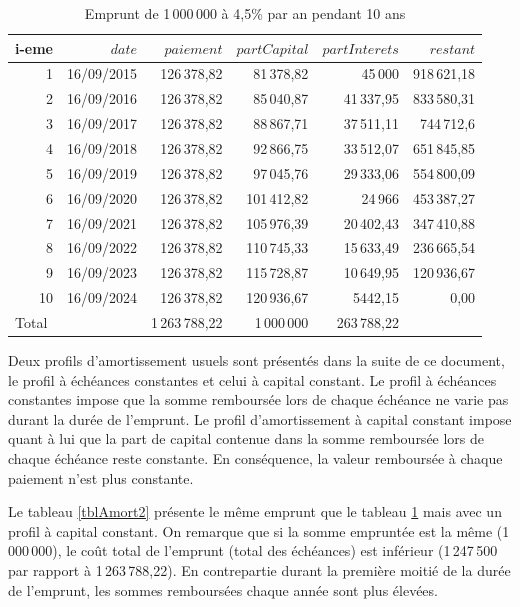 \documentclass[11pt,a4paper]{scrartcl}
\begin{document}
\begin{table}
\centering
\caption{Emprunt de 1\,000\,000 à 4,5\% par an pendant 10 ans}
\begin{tabular}{rrrrrr}
i-eme & $date$ & $paiement$ & $partCapital$ & $partInterets$ & $restant$ \\ 
\hline
1 & 16/09/2015 & 126\,378,82 & 81\,378,82 & 45\,000 & 918\,621,18 \\ 
2 & 16/09/2016 & 126\,378,82 & 85\,040,87 & 41\,337,95 & 833\,580,31 \\ 
3 & 16/09/2017 & 126\,378,82 & 88\,867,71 & 37\,511,11 & 744\,712,6 \\ 
4 & 16/09/2018 & 126\,378,82 & 92\,866,75 & 33\,512,07 & 651\,845,85 \\ 
5 & 16/09/2019 & 126\,378,82 & 97\,045,76 & 29\,333,06 & 554\,800,09 \\ 
6 & 16/09/2020 & 126\,378,82 & 101\,412,82 & 24\,966 & 453\,387,27 \\ 
7 & 16/09/2021 & 126\,378,82 & 105\,976,39 & 20\,402,43 & 347\,410,88 \\ 
8 & 16/09/2022 & 126\,378,82 & 110\,745,33 & 15\,633,49 & 236\,665,54 \\ 
9 & 16/09/2023 & 126\,378,82 & 115\,728,87 & 10\,649,95 & 120\,936,67 \\ 
10 & 16/09/2024 & 126\,378,82 & 120\,936,67 & 5442,15 & 0,00 \\ 
\hline
\multicolumn{1}{l}{Total} &  & 1\,263\,788,22 & 1\,000\,000 & 263\,788,22 & \\ 
\end{tabular}
\label{tblAmort1}
\end{table}



Deux profils d'amortissement usuels sont présentés dans la suite de ce document, le profil à échéances constantes et celui à capital constant. Le profil à échéances constantes impose que la somme remboursée lors de chaque échéance ne varie pas durant la durée de l'emprunt. Le profil d'amortissement à capital constant impose quant à lui que la part de capital contenue dans la somme remboursée lors de chaque échéance reste constante. En conséquence, la valeur remboursée à chaque paiement n'est plus constante.

Le tableau \ref{tblAmort2} présente le même emprunt que le tableau \ref{tblAmort1} mais avec un profil à capital constant. On remarque que si la somme empruntée est la même (1\,000\,000), le coût total de l'emprunt (total des échéances) est inférieur (1\,247\,500 par rapport à 1\,263\,788,22). En contrepartie durant la première moitié de la durée de l'emprunt, les sommes remboursées chaque année sont plus élevées.
\end{document}
